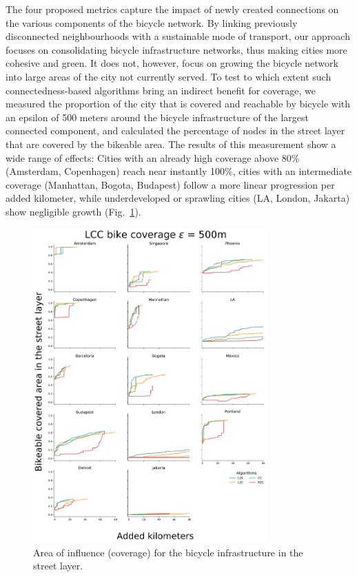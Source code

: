 The four proposed metrics capture the impact of newly created connections on the various components of the bicycle network. By linking previously disconnected neighbourhoods with a sustainable mode of transport, our approach focuses on consolidating bicycle infrastructure networks, thus making cities more cohesive and green. It does not, however, focus on growing the bicycle network into large areas of the city not currently served. To test to which extent such connectedness-based algorithms bring an indirect benefit for coverage, we measured the proportion of the city that is covered and reachable by bicycle with an epsilon of 500 meters around the bicycle infrastructure of the largest connected component, and calculated the percentage of nodes in the street layer that are covered by the bikeable area. The results of this measurement show a wide range of effects: Cities with an already high coverage above 80\% (Amsterdam, Copenhagen) reach near instantly 100\%, cities with an intermediate coverage (Manhattan, Bogota, Budapest) follow a more linear progression per added kilometer, while underdeveloped or sprawling cities (LA, London, Jakarta) show negligible growth (Fig.~\ref{fig:Coverage}).

\begin{figure}[th!]
  \centering
  \includegraphics[width=0.8\textwidth]{images/datadriven/Reviewer_Coverage.png}
  \caption[Bicycle infrastructure service area]{Area of influence (coverage) for the bicycle infrastructure in the street layer.}
  \label{fig:Coverage}
\end{figure}

